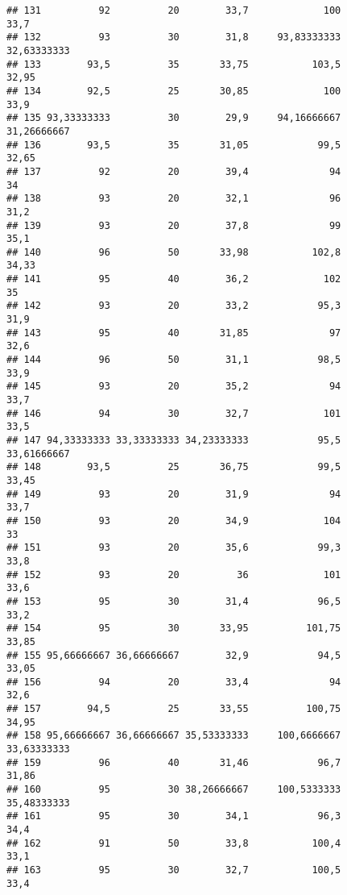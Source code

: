 \documentclass[
]{article}
\begin{document}
\begin{verbatim}
## 131          92          20        33,7             100                 33,7
## 132          93          30        31,8     93,83333333          32,63333333
## 133        93,5          35       33,75           103,5                32,95
## 134        92,5          25       30,85             100                 33,9
## 135 93,33333333          30        29,9     94,16666667          31,26666667
## 136        93,5          35       31,05            99,5                32,65
## 137          92          20        39,4              94                   34
## 138          93          20        32,1              96                 31,2
## 139          93          20        37,8              99                 35,1
## 140          96          50       33,98           102,8                34,33
## 141          95          40        36,2             102                   35
## 142          93          20        33,2            95,3                 31,9
## 143          95          40       31,85              97                 32,6
## 144          96          50        31,1            98,5                 33,9
## 145          93          20        35,2              94                 33,7
## 146          94          30        32,7             101                 33,5
## 147 94,33333333 33,33333333 34,23333333            95,5          33,61666667
## 148        93,5          25       36,75            99,5                33,45
## 149          93          20        31,9              94                 33,7
## 150          93          20        34,9             104                   33
## 151          93          20        35,6            99,3                 33,8
## 152          93          20          36             101                 33,6
## 153          95          30        31,4            96,5                 33,2
## 154          95          30       33,95          101,75                33,85
## 155 95,66666667 36,66666667        32,9            94,5                33,05
## 156          94          20        33,4              94                 32,6
## 157        94,5          25       33,55          100,75                34,95
## 158 95,66666667 36,66666667 35,53333333     100,6666667          33,63333333
## 159          96          40       31,46            96,7                31,86
## 160          95          30 38,26666667     100,5333333          35,48333333
## 161          95          30        34,1            96,3                 34,4
## 162          91          50        33,8           100,4                 33,1
## 163          95          30        32,7           100,5                 33,4

\end{verbatim}
\end{document}
